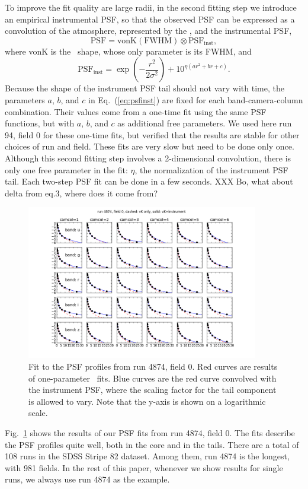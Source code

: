 To improve the fit quality are large radii, in the second fitting step we introduce an
empirical instrumental PSF, so that the observed PSF can be expressed as
a convolution of the atmosphere, represented by the \vk, and
the instrumental PSF,
\begin{equation}
        \textrm{PSF} = \textrm{vonK} (\textrm{FWHM}) \otimes \textrm{PSF}_{\textrm{inst}},
\end{equation} 
where vonK is the \vk~shape, whose only parameter is its FWHM, and
\begin{equation}
        \textrm{PSF}_{\textrm{inst}} = \exp(-\frac{r^2}{2\sigma^2}) + 10^{\eta(ar^2+br+c)}.
\label{eq:psfinst}
\end{equation} 
Because the shape of the instrument PSF tail should not vary with
time, the parameters $a$, $b$, and $c$ in Eq.~(\ref{eq:psfinst}) are
fixed for each band-camera-column combination.
Their values come from a one-time fit using the same PSF functions,
but with $a$, $b$, and $c$ as additional free parameters.
We used here run 94, field 0 for these one-time fits, but verified that 
the results are stable for other choices of run and field. 
These fits are very slow but need to be done only once.
Although this second fitting step involves a 2-dimensional convolution,
there is only one free parameter in the fit: $\eta$, the normalization of the
instrument PSF tail. Each two-step PSF fit can be done in a few seconds.
XXX Bo, what about delta from eq.3, where does it come from? 


\begin{figure}
\centering
\includegraphics[width=0.9\textwidth]{FIGURES/psffit.png}
\caption{Fit to the PSF profiles from run 4874, field 0. Red curves
  are results of one-parameter \vk~fits. Blue curves are the red
  curve convolved with the instrument PSF, where the scaling factor for
  the tail component is allowed to vary. Note that the y-axis is shown on
  a logarithmic scale.
\label{fig:psffit}}
\end{figure}

Fig.~\ref{fig:psffit} shows the results of our PSF fits from run 4874,
field 0. The fits describe the PSF profiles quite well, both in the core and in the tails.
There are a total of 108 runs in the SDSS Stripe 82 dataset. Among them, run 4874 
is the longest, with 981 fields. In the rest of this paper, whenever we show 
results for single runs, we always use run 4874 as the example.
